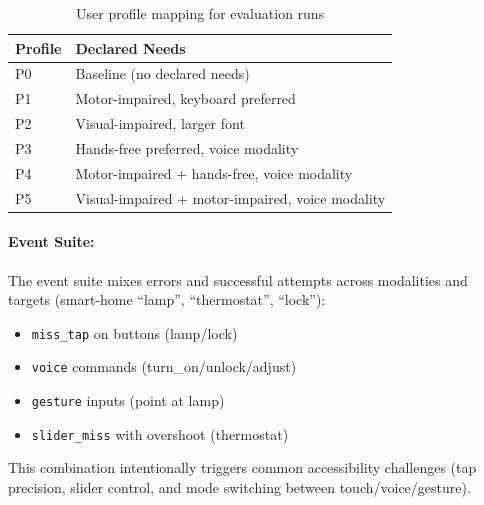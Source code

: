 \documentclass[openany]{book}
\begin{document}
\begin{table}[h]
\centering
\caption{User profile mapping for evaluation runs}
\begin{tabular}{ll}
\toprule
\textbf{Profile} & \textbf{Declared Needs} \\
\midrule
P0 & Baseline (no declared needs) \\
P1 & Motor-impaired, keyboard preferred \\
P2 & Visual-impaired, larger font \\
P3 & Hands-free preferred, voice modality \\
P4 & Motor-impaired + hands-free, voice modality \\
P5 & Visual-impaired + motor-impaired, voice modality \\
\bottomrule
\end{tabular}
\end{table}

\paragraph{Event Suite:}
The event suite mixes errors and successful attempts across modalities and targets (smart-home “lamp”, “thermostat”, “lock”):
\begin{itemize}
    \item \texttt{miss\_tap} on buttons (lamp/lock)
    \item \texttt{voice} commands (turn\_on/unlock/adjust)
    \item \texttt{gesture} inputs (point at lamp)
    \item \texttt{slider\_miss} with overshoot (thermostat)
\end{itemize}
This combination intentionally triggers common accessibility challenges (tap precision, slider control, and mode switching between touch/voice/gesture).
\end{document}
